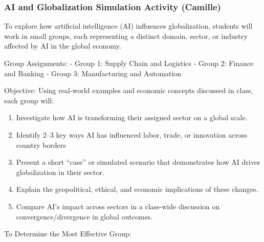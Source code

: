 \documentclass[
  11pt,
]{article}
\providecommand{\tightlist}{%
  \setlength{\itemsep}{0pt}\setlength{\parskip}{0pt}}
\begin{document}
\subsubsection{AI and Globalization Simulation Activity
(Camille)}\label{ai-and-globalization-simulation-activity-camille}

To explore how artificial intelligence (AI) influences globalization,
students will work in small groups, each representing a distinct domain,
sector, or industry affected by AI in the global economy.

Group Assignments: - Group 1: Supply Chain and Logistics - Group 2:
Finance and Banking - Group 3: Manufacturing and Automation

Objective: Using real-world examples and economic concepts discussed in
class, each group will:

\begin{enumerate}
\def\labelenumi{\arabic{enumi}.}
\tightlist
\item
  Investigate how AI is transforming their assigned sector on a global
  scale.
\item
  Identify 2--3 key ways AI has influenced labor, trade, or innovation
  across country borders
\item
  Present a short ``case'' or simulated scenario that demonstrates how
  AI drives globalization in their sector.
\item
  Explain the geopolitical, ethical, and economic implications of these
  changes.
\item
  Compare AI's impact across sectors in a class-wide discussion on
  convergence/divergence in global outcomes.
\end{enumerate}

To Determine the Most Effective Group:
\end{document}
